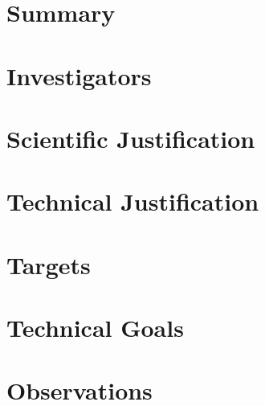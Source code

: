 \documentclass[11pt,a4paper,twoside]{article}
\begin{document}
    

    \section*{Summary}
    
    \section*{Investigators}
    

    \section*{Scientific Justification}
    

    \section*{Technical Justification}
    

    \section*{Targets}
    

    \section*{Technical Goals}
    

    \section*{Observations}
    




    
    {
        \footnotesize
        
    }
\end{document}
